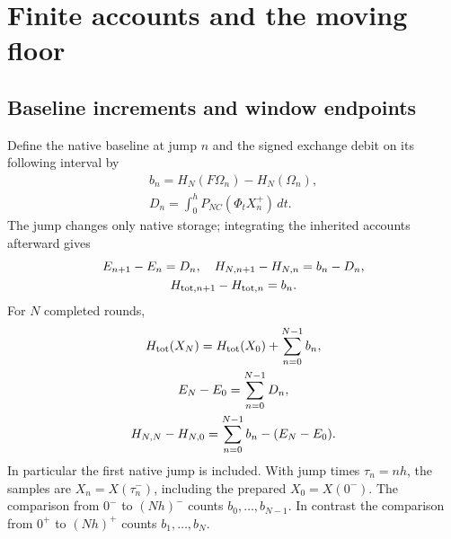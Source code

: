 \section{Finite accounts and the moving floor}\label{sec:accounts}
\subsection{Baseline increments and window endpoints}\label{sec:windows}
Define the native baseline at jump $n$ and the signed exchange debit on its following interval by
\begin{equation}\label{eq:a10}%
\begin{gathered}
b_n=H_N(F\Omega_n)-H_N(\Omega_n),\\ D_n=\int_0^hP_{NC}(\Phi_tX_n^+)\,dt .
\end{gathered}
\end{equation}
The jump changes only native storage; integrating the inherited accounts afterward gives
\begin{equation}\label{eq:a11}%
\begin{gathered}
E_{n+1}-E_n=D_n,\quad H_{N,n+1}-H_{N,n}=b_n-D_n,\\ H_{{\rm tot},n+1}-H_{{\rm tot},n}=b_n.
\end{gathered}
\end{equation}
For $N$ completed rounds,
\begin{equation}\label{eq:a12}%
\begin{gathered}
H_{\rm tot}(X_N)=H_{\rm tot}(X_0)+\sum_{n=0}^{N-1}b_n,\\ E_N-E_0=\sum_{n=0}^{N-1}D_n,\\ H_{N,N}-H_{N,0}=\sum_{n=0}^{N-1}b_n-(E_N-E_0).
\end{gathered}
\end{equation}
In particular the first native jump is included. With jump times $\tau_n=nh$, the samples are $X_n=X(\tau_n^-)$, including the prepared $X_0=X(0^-)$. The comparison from $0^-$ to $(Nh)^-$ counts $b_0,\ldots,b_{N-1}$. In contrast the comparison from $0^+$ to $(Nh)^+$ counts $b_1,\ldots,b_N$.

